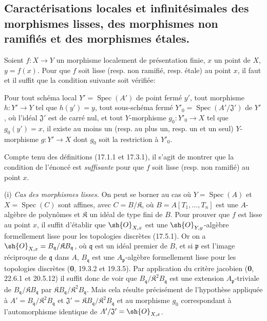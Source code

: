 \subsection{Caractérisations locales et infinitésimales des morphismes lisses, des morphismes non ramifiés et des morphismes étales.}

\begin{proposition}[17.14.1]
\label{IV.17.14.1}
Soient $f:X\to Y$ un morphisme localement de présentation finie, $x$ un point de $X$, $y=f(x)$. Pour que $f$ soit lisse \textup{(resp.} non ramifié, \textup{resp.} étale\textup{)} au point $x$, il faut et il suffit que la condition suivante soit vérifiée:

Pour tout \textup{schéma local} $Y'=\operatorname{Spec}(A')$ de point fermé $y'$, tout morphisme $h:Y'\to Y$ tel que $h(y')=y$, tout sous-schéma fermé $Y'_0=\operatorname{Spec}(A'/\mathfrak{J}')$ de $Y'$, où l'idéal $\mathfrak{J}'$ est de carré nul, et tout $Y$-morphisme $g_0:Y'_0\to X$ tel que $g_0(y')=x$, il existe au moins un \textup{(resp.} au plus un, \textup{resp.} un et un seul\textup{)} $Y$-morphisme $g:Y'\to X$ dont $g_0$ soit la restriction à $Y'_0$.
\end{proposition}

Compte tenu des définitions (17.1.1 et 17.3.1), il s'agit de montrer que la condition de l'énoncé est \emph{suffisante} pour que $f$ soit lisse (resp. non ramifié) au point $x$.

(i) \emph{Cas des morphismes lisses.} On peut se borner au cas où $Y=\operatorname{Spec}(A)$ et $X=\operatorname{Spec}(C)$ sont affines, avec $C=B/\mathfrak{K}$, où $B=A[T_1,\ldots,T_n]$ est une $A$-algèbre de polynômes et $\mathfrak{K}$ un idéal de type fini de $B$. Pour prouver que $f$ est lisse au point $x$, il suffit d'établir que $\sh{O}_{X,x}$ est une $\sh{O}_{Y,y}$-algèbre formellement lisse pour les topologies discrètes (17.5.1). Or on a $\sh{O}_{X,x}=B_{\mathfrak q}/\mathfrak{K}B_{\mathfrak q}$, où $\mathfrak q$ est un idéal premier de $B$, et si $\mathfrak p$ est l'image réciproque de $\mathfrak q$ dans $A$, $B_{\mathfrak q}$ est une $A_{\mathfrak p}$-algèbre formellement lisse pour les topologies discrètes (\textbf{0}, 19.3.2 et 19.3.5). Par application du critère jacobien (\textbf{0}, 22.6.1 et 20.5.12) il suffit donc de voir que $B_{\mathfrak q}/\mathfrak{K}^2B_{\mathfrak q}$ est une extension $A_{\mathfrak p}$-triviale de $B_{\mathfrak q}/\mathfrak{K}B_{\mathfrak q}$ par $\mathfrak{K}B_{\mathfrak q}/\mathfrak{K}^2B_{\mathfrak q}$. Mais cela résulte précisément de l'hypothèse appliquée à $A'=B_{\mathfrak q}/\mathfrak{K}^2B_{\mathfrak q}$ et $\mathfrak{J}'=\mathfrak{K}B_{\mathfrak q}/\mathfrak{K}^2B_{\mathfrak q}$ et au morphisme $g_0$ correspondant à l'automorphisme identique de $A'/\mathfrak{J}'=\sh{O}_{X,x}$.

